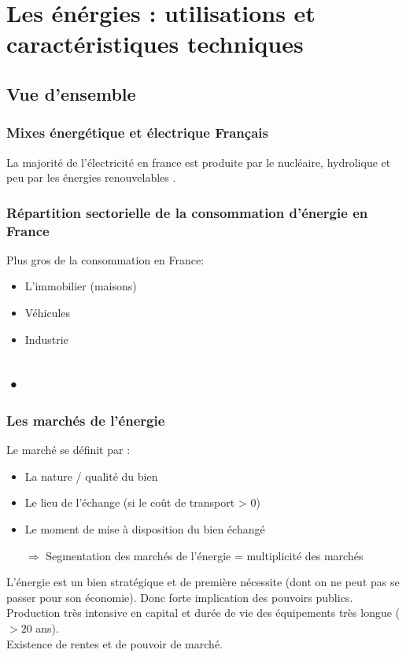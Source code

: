 \documentclass{article}
\begin{document}
\section{Les énérgies : utilisations et caractéristiques techniques}
\subsection{Vue d'ensemble }
\subsubsection{Mixes énergétique et électrique Français}
La majorité de l'électricité en france est produite par le nucléaire, hydrolique et peu par les énergies renouvelables .\\
\subsubsection{Répartition sectorielle de la consommation d'énergie en France}
Plus gros de la consommation en France: 
\begin{itemize}
	\item L'immobilier (maisons)
	\item Véhicules
	\item Industrie
\end{itemize}

\subsection{•}

\subsubsection{Les marchés de l'énergie}
Le marché se définit par : 
\begin{itemize}
	\item La nature / qualité du bien 
	\item Le lieu de l'échange (si le coût de transport > 0)
	\item Le moment de mise à disposition du bien échangé
	\item[$ \Rightarrow $] Segmentation des marchés de l'énergie = multiplicité des marchés
\end{itemize}
L'énergie est un bien stratégique et de première nécessite (dont on ne peut pas se passer pour son économie). Donc forte implication des pouvoirs publics. \\
Production très intensive en capital et durée de vie des équipements très longue ( $ > 20 $ ans). \\
Existence de rentes et de pouvoir de marché.
\end{document}
